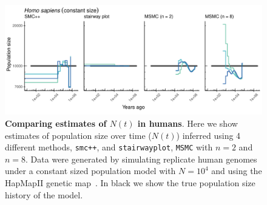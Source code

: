 \documentclass[12pt,halfline,a4paper]{ouparticle}
\newcommand{\MSMC}{\texttt{MSMC}\xspace}
\newcommand{\smcpp}{\texttt{smc++}\xspace}
\begin{document}
\begin{figure}
\begin{center}
\includegraphics[width=0.8\linewidth]{display_items/homo_sapiens_constant.png}
\caption{\textbf{Comparing estimates of $N(t)$ in humans}. Here we show estimates of population
size over time ($N(t)$) inferred using 4 different methods, \smcpp, and \texttt{stairwayplot},
\MSMC with $n=2$ and $n=8$. Data were generated by simulating
replicate human genomes under a constant sized population model with $N=10^4$ and using the
HapMapII genetic map~\citep{international2007second}. In black we show the true population size history
of the model.}
\label{fig:n_t_HomSap_constant}
\end{center}
\end{figure}
\end{document}
